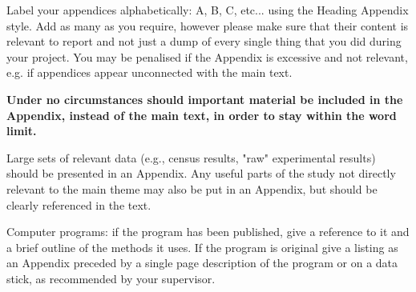 \documentclass{article}
\begin{document}
Label your appendices alphabetically: A, B, C, etc... using the Heading Appendix style. Add as many as you require, however please make sure that their content is relevant to report and not just a dump of every single thing that you did during your project. You may be penalised if the Appendix is excessive and not relevant, e.g. if appendices appear unconnected with the main text.

\textbf{Under no circumstances should important material be included in the Appendix, instead of the
  main text, in order to stay within the word limit.}

Large sets of relevant data (e.g., census results, "raw" experimental results) should be presented in an Appendix. Any useful parts of the study not directly relevant to the main theme may also be put in an Appendix, but should be clearly referenced in the text. 

Computer programs: if the program has been published, give a reference to it and a brief outline of the methods it uses. If the program is original give a listing as an Appendix preceded by a single page description of the program or on a data stick, as recommended by your supervisor.
\end{document}
